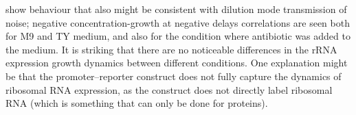 show behaviour that also might be consistent with dilution mode transmission of noise; negative concentration-growth at negative delays correlations are seen both for M9 and TY medium, and also for the condition where antibiotic was added to the medium.
%
It is striking that there are no noticeable differences in the rRNA expression growth dynamics between different conditions.
%
One explanation might be that 
the promoter--reporter construct does not fully capture the dynamics of ribosomal RNA expression, as the construct does not directly label ribosomal RNA (which is something that can only be done for proteins).



